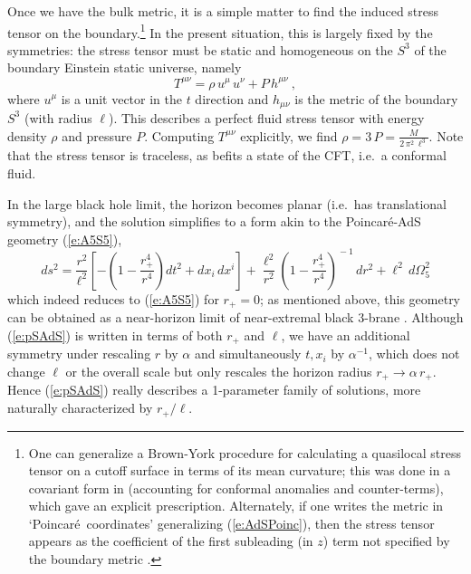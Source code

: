 \documentclass[12pt,a4paper]{article}
\def\req#1{(\ref{#1})}
\def\Poinc{Poincar\' e}
\def\Rads{\ell}
\def\rh{r_+}
\begin{document}
Once we have the bulk metric, it is a simple matter  to find the induced stress tensor on the boundary.\footnote{
One can generalize a Brown-York procedure \cite{Brown:1992br} for 
calculating a quasilocal stress tensor on a cutoff surface in terms of its mean curvature; this was done in a covariant form  in \cite{Balasubramanian:1999re} (accounting for conformal anomalies and counter-terms), 
which gave an explicit prescription.  Alternately, if one writes the metric in `\Poinc\ coordinates' generalizing \req{e:AdSPoinc}, then the stress tensor appears as the coefficient of the first subleading  (in $z$) term not specified by the boundary metric \cite{Henningson:1998gx,deHaro:2000xn}.}
  In the present situation, this is largely fixed by the symmetries:  the stress tensor must be static and homogeneous on the $S^3$ of the boundary Einstein static universe, namely
%
\begin{equation}
T^{\mu\nu} = \rho \, u^\mu \, u^\nu + P \, h^{\mu\nu} \ ,
\label{e:sadsTab}
\end{equation}	
%
where $u^\mu$ is a unit vector in the $t$ direction and $h_{\mu\nu}$ is the metric of the boundary $S^3$ (with radius $\Rads$).
This describes a perfect fluid stress tensor with energy density $\rho$ and pressure $P$.  Computing $T^{\mu\nu}$ explicitly, we find 
$\rho = 3 \, P = \frac{M}{2 \, \pi^2 \, \Rads^3}$.  Note that the stress tensor is traceless, as befits a state of the CFT, i.e.\ a conformal fluid.  
 
In the large  black hole limit, the horizon becomes planar (i.e.\ has translational symmetry), and the solution simplifies to a form akin to  the \Poinc-AdS geometry \req{e:A5S5},
%
\begin{equation}
ds^2 =  \frac{r^2}{\Rads^2}\left[ - \left( 1- \frac{\rh^4}{r^4} \right) dt^2
+ dx_i \, dx^i \right] + \frac{\Rads^2}{r^2}  \left( 1- \frac{\rh^4}{r^4} \right)^{\! \! -1} \, dr^2 + \Rads^2 \, d\Omega_5^2
\label{e:pSAdS}
\end{equation}	
%
which indeed reduces to \req{e:A5S5} for $\rh= 0$; as mentioned above, this geometry can be obtained as a near-horizon limit of near-extremal black 3-brane \cite{Maldacena:1997re}.
Although \req{e:pSAdS} is written in terms of both $\rh$ and $\Rads$, we have an additional symmetry under rescaling $r$ by $\alpha$ and simultaneously $t,x_i$ by $\alpha^{-1}$, which does not change $\Rads$ or the overall scale but only rescales the horizon radius $\rh \to \alpha \, \rh$.  Hence  \req{e:pSAdS} really describes a 1-parameter family of solutions, more naturally characterized by $\rh / \Rads$.
\end{document}
